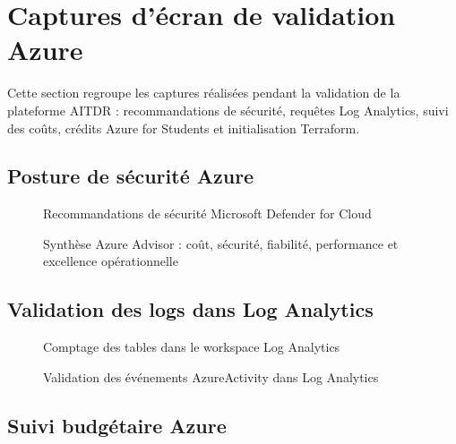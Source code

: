 \section{Captures d'écran de validation Azure}

Cette section regroupe les captures réalisées pendant la validation de la plateforme AITDR : recommandations de sécurité, requêtes Log Analytics, suivi des coûts, crédits Azure for Students et initialisation Terraform.

\subsection{Posture de sécurité Azure}

\begin{figure}[H]
\centering
{}
\caption{Recommandations de sécurité Microsoft Defender for Cloud}
\label{fig:azure_security_recommendations}
\end{figure}

\begin{figure}[H]
\centering
{}
\caption{Synthèse Azure Advisor : coût, sécurité, fiabilité, performance et excellence opérationnelle}
\label{fig:azure_advisor_overview}
\end{figure}

\subsection{Validation des logs dans Log Analytics}

\begin{figure}[H]
\centering
{}
\caption{Comptage des tables dans le workspace Log Analytics}
\label{fig:log_analytics_table_counts}
\end{figure}

\begin{figure}[H]
\centering
{}
\caption{Validation des événements AzureActivity dans Log Analytics}
\label{fig:log_analytics_azure_activity}
\end{figure}

\subsection{Suivi budgétaire Azure}

